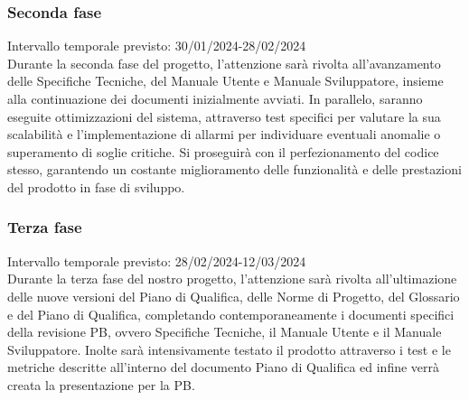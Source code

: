 \subsubsection{Seconda fase}
Intervallo temporale previsto: 30/01/2024-28/02/2024
\\ 
\vspace{0.2cm} 
Durante la seconda fase del progetto, l'attenzione sarà rivolta all'avanzamento delle Specifiche Tecniche, del Manuale Utente e Manuale Sviluppatore, insieme alla continuazione dei documenti inizialmente avviati. In parallelo, saranno eseguite ottimizzazioni del sistema, attraverso test specifici per valutare la sua scalabilità e l'implementazione di allarmi per individuare eventuali anomalie o superamento di soglie critiche. Si proseguirà con il perfezionamento del codice stesso, garantendo un costante miglioramento delle funzionalità e delle prestazioni del prodotto in fase di sviluppo.

\subsubsection{Terza fase}
Intervallo temporale previsto: 28/02/2024-12/03/2024\\ 
\vspace{0.2cm} 
Durante la terza fase del nostro progetto, l'attenzione sarà rivolta all'ultimazione delle nuove versioni del Piano di Qualifica, delle Norme di Progetto, del Glossario e del Piano di Qualifica, completando contemporaneamente i documenti specifici della revisione PB, ovvero Specifiche Tecniche, il Manuale Utente e il Manuale Sviluppatore. Inolte sarà intensivamente testato il prodotto attraverso i test e le metriche descritte all'interno del documento Piano di Qualifica ed infine verrà creata la presentazione per la PB.
